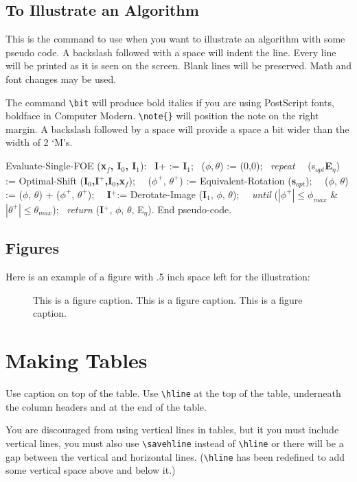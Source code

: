 \begin{article}
\subsection{To Illustrate an Algorithm}

This is the command to use when you want to illustrate an algorithm
with some pseudo code. A backslash followed with a space will
indent the line. Every line will be printed
as it is seen on the screen. Blank lines will be preserved.
Math and font changes may be used. 

The command
\verb+\bit+ will produce bold italics if you are using PostScript fonts, 
boldface in Computer Modern. \verb+\note{}+ will position the
note on the right margin. A backslash followed by a space
will provide a space a bit wider than the width of 2 `M's.

\begin{algorithm}
{\bit Evaluate-Single-FOE} ({\bf x$_f$, I$_0$, I$_1$}):
\ {\bf I}+ := {\bf I}$_1$;
\ ($\phi,\theta$) := (0,0);
\ {\it repeat}
\ \ (s$_{opt}${\bf E}$_\eta$) := {\bit Optimal-Shift} ({\bf I$_0$,I$^+$,I$_0$,x$_f$});
\ \ ($\phi^+$, $\theta^+$) := {\bit Equivalent-Rotation} ({\bf s}$_{opt}$);
\ \ ($\phi$, $\theta$) := ($\phi$, $\theta$) + ($\phi^+$, $\theta^+$);
\ \ {\bf I}$^+$:= {\bit Derotate-Image} ({\bf I}$_1$, $\phi$, $\theta$);
\ \ {\it until} ($|\phi^+|\leq\phi_{max}$ \& $|\theta^+|\leq\theta_{max}$);
\ {\it return} ({\bf I}$^+$, $\phi$, $\theta$, E$_\eta$).
End pseudo-code.
\end{algorithm}


\subsection{Figures}
Here is an example of a figure with .5 inch space left for
the illustration:
\begin{figure}[h]
\vspace*{.5in}
\caption{This is a figure caption.
This is a figure caption.
This is a figure caption.}
\end{figure}

\section{Making Tables}
Use caption on top of the table. 
Use \verb+\hline+ at the top of the table, underneath the column headers
and at the end of the table.

You are discouraged from using vertical lines in tables, but
it you must include vertical lines, you must also use 
\verb+\savehline+ instead of \verb+\hline+ or there will be a
gap between the vertical and horizontal lines.
(\verb+\hline+ has been redefined to add some vertical space above and
below it.)


\end{article}

